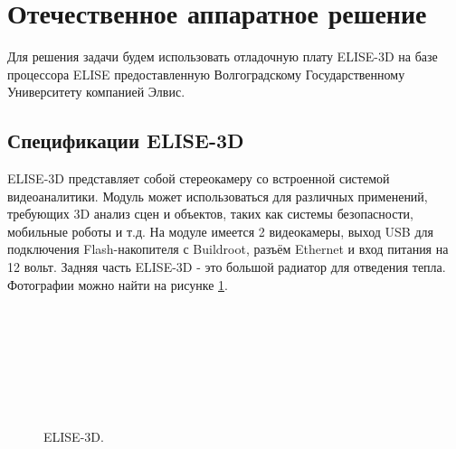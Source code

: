 \documentclass[14pt,a4paper]{scrartcl}
\begin{document}
		

\section{Отечественное аппаратное решение}

	Для  решения задачи будем использовать отладочную плату ELISE-3D на базе процессора ELISE предоставленную Волгоградскому Государственному Университету компанией Элвис.
	
	\subsection{Спецификации ELISE-3D}
	
		ELISE-3D представляет собой стереокамеру со встроенной системой видеоаналитики. Модуль может использоваться для различных применений, требующих 3D анализ сцен и объектов, таких как системы безопасности, мобильные роботы и т.д. На модуле имеется 2 видеокамеры, выход USB для подключения Flash-накопителя с Buildroot, разъём Ethernet и вход питания на 12 вольт. Задняя часть ELISE-3D - это большой радиатор для отведения тепла. Фотографии можно найти на рисунке \ref{fig:ELISE-3D}\cite{bib:Chuprikov_NIR}.
		
		\begin{figure}[H]
			\begin{minipage}[h]{0.47\linewidth}
				 \hspace{0.1cm} \\
			\end{minipage}
			\hfill
			\begin{minipage}[h]{0.47\linewidth}
				 \hspace{0.1cm} \\
			\end{minipage}
			\vfill
			\begin{minipage}[h]{0.47\linewidth}
				 \\
			\end{minipage}
			\hfill
			\begin{minipage}[h]{0.47\linewidth}
				 \\
			\end{minipage}
			\caption{ELISE-3D.}
			\label{fig:ELISE-3D}
		\end{figure}
	
\end{document}
